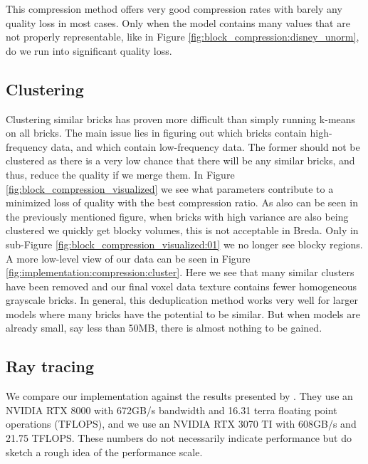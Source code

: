 This compression method offers very good compression rates with barely any quality loss in most cases. Only when the model contains many values that are not properly representable, like in Figure \ref{fig:block_compression:disney_unorm}, do we run into significant quality loss.

\subsection{Clustering} \label{results:clustering}
Clustering similar bricks has proven more difficult than simply running k-means on all bricks. The main issue lies in figuring out which bricks contain high-frequency data, and which contain low-frequency data. The former should not be clustered as there is a very low chance that there will be any similar bricks, and thus, reduce the quality if we merge them. In Figure \ref{fig:block_compression_visualized} we see what parameters contribute to a minimized loss of quality with the best compression ratio. As also can be seen in the previously mentioned figure, when bricks with high variance are also being clustered we quickly get blocky volumes, this is not acceptable in Breda. Only in sub-Figure \ref{fig:block_compression_visualized:01} we no longer see blocky regions. A more low-level view of our data can be seen in Figure \ref{fig:implementation:compression:cluster}. Here we see that many similar clusters have been removed and our final voxel data texture contains fewer homogeneous grayscale bricks.  In general, this deduplication method works very well for larger models where many bricks have the potential to be similar. But when models are already small, say less than 50MB, there is almost nothing to be gained.

\subsection{Ray tracing} \label{results:ray_tracing}
We compare our implementation against the results presented by \cite{NanoVDBBenchmark}. They use an NVIDIA RTX 8000 with 672GB/s bandwidth and 16.31 terra floating point operations (TFLOPS), and we use an NVIDIA RTX 3070 TI with 608GB/s and 21.75 TFLOPS. These numbers do not necessarily indicate performance but do sketch a rough idea of the performance scale.

